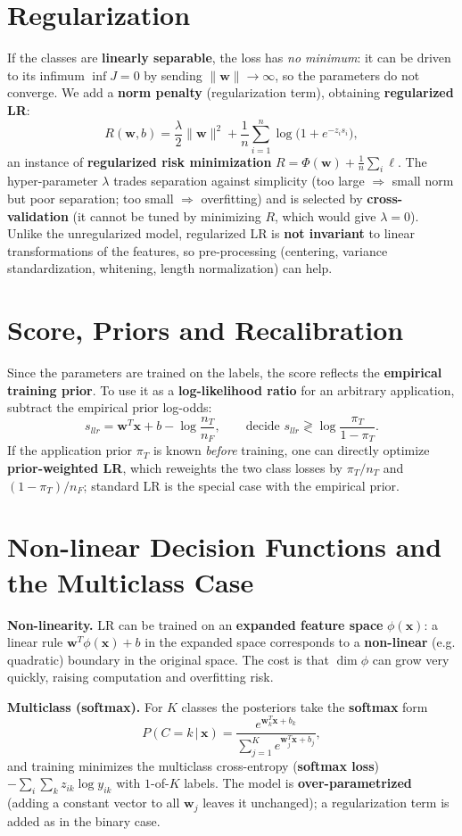 \section*{Regularization}

If the classes are \textbf{linearly separable}, the loss has \emph{no minimum}: it can be driven to its infimum $\inf J=0$ by sending $\|\mathbf{w}\|\to\infty$, so the parameters do not converge. We add a \textbf{norm penalty} (regularization term), obtaining \textbf{regularized LR}:
\[
R(\mathbf{w},b)=\frac{\lambda}{2}\|\mathbf{w}\|^2+\frac{1}{n}\sum_{i=1}^n\log\!\big(1+e^{-z_i s_i}\big),
\]
an instance of \textbf{regularized risk minimization} $R=\Phi(\mathbf{w})+\frac1n\sum_i\ell$. The hyper-parameter $\lambda$ trades separation against simplicity (too large $\Rightarrow$ small norm but poor separation; too small $\Rightarrow$ overfitting) and is selected by \textbf{cross-validation} (it cannot be tuned by minimizing $R$, which would give $\lambda=0$). Unlike the unregularized model, regularized LR is \textbf{not invariant} to linear transformations of the features, so pre-processing (centering, variance standardization, whitening, length normalization) can help.

\section*{Score, Priors and Recalibration}

Since the parameters are trained on the labels, the score reflects the \textbf{empirical training prior}. To use it as a \textbf{log-likelihood ratio} for an arbitrary application, subtract the empirical prior log-odds:
\[
s_{llr}=\mathbf{w}^T\mathbf{x}+b-\log\frac{n_T}{n_F},\qquad\text{decide } s_{llr}\gtrless\log\frac{\pi_T}{1-\pi_T}.
\]
If the application prior $\pi_T$ is known \emph{before} training, one can directly optimize \textbf{prior-weighted LR}, which reweights the two class losses by $\pi_T/n_T$ and $(1-\pi_T)/n_F$; standard LR is the special case with the empirical prior.

\section*{Non-linear Decision Functions and the Multiclass Case}

\textbf{Non-linearity.} LR can be trained on an \textbf{expanded feature space} $\phi(\mathbf{x})$: a linear rule $\mathbf{w}^T\phi(\mathbf{x})+b$ in the expanded space corresponds to a \textbf{non-linear} (e.g. quadratic) boundary in the original space. The cost is that $\dim\phi$ can grow very quickly, raising computation and overfitting risk.

\textbf{Multiclass (softmax).} For $K$ classes the posteriors take the \textbf{softmax} form
\[
P(C{=}k\,|\,\mathbf{x})=\frac{e^{\mathbf{w}_k^T\mathbf{x}+b_k}}{\sum_{j=1}^K e^{\mathbf{w}_j^T\mathbf{x}+b_j}},
\]
and training minimizes the multiclass cross-entropy (\textbf{softmax loss}) $-\sum_i\sum_k z_{ik}\log y_{ik}$ with $1$-of-$K$ labels. The model is \textbf{over-parametrized} (adding a constant vector to all $\mathbf{w}_j$ leaves it unchanged); a regularization term is added as in the binary case.
